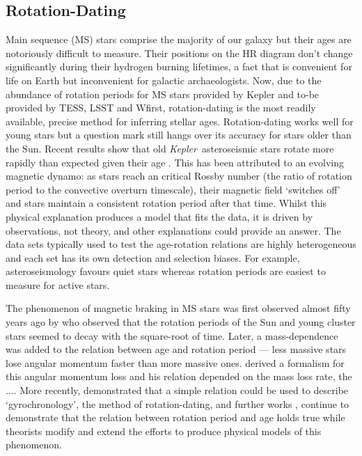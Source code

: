 \documentclass[useAMS, usenatbib, preprint, 12pt]{aastex}
\newcommand{\Kepler}{{\it Kepler}}
\newcommand{\kepler}{\Kepler}
\newcommand{\eg}{{\it e.g.}}
\begin{document}
\subsection{Rotation-Dating}
\label{sec:rotation}

Main sequence (MS) stars comprise the majority of our galaxy but their ages
are notoriously difficult to measure.
Their positions on the HR diagram don't change significantly during their
    hydrogen burning lifetimes, a fact that is convenient for life on Earth
    but inconvenient for galactic archaeologists.
Now, due to the abundance of rotation periods for MS stars provided by Kepler
    and to-be provided by TESS, LSST and Wfirst, rotation-dating is the most
    readily available, precise method for inferring stellar ages.
Rotation-dating works well for young stars but a question mark still hangs
    over its accuracy for stars older than the Sun.
Recent results show that old \kepler\ asteroseismic stars rotate more rapidly
    than expected given their age \citep[\eg][]{Angus2015, Vansaders2016,
    Metcalfe2016}.
This has been attributed to an evolving magnetic dynamo: as stars reach an
    critical Rossby number (the ratio of rotation period to the convective
    overturn timescale), their magnetic field `switches off' and stars
    maintain a consistent rotation period after that time.
Whilst this physical explanation produces a model that fits the data, it
    is driven by observations, not theory, and other explanations could
    provide an answer.
The data sets typically used to test the age-rotation relations are highly
    heterogeneous and each set has its own detection and selection biases.
For example, asteroseismology favours quiet stars whereas rotation periods are
    easiest to measure for active stars.

The phenomenon of magnetic braking in MS stars was first observed almost fifty
years ago by \citet{Skumanich1972} who observed that the rotation periods of
the Sun and young cluster stars seemed to decay with the square-root of time.
Later, a mass-dependence was added to the relation between age and rotation
period --- less massive stars lose angular momentum faster than more massive
ones.
\citet{Kawaler1988} derived a formalism for this angular momentum loss and his
relation depended on the mass loss rate, the ....
More recently, \citet{Barnes2003} demonstrated that a simple relation could be
used to describe `gyrochronology', the method of rotation-dating, and further
works \citep[\eg][]{Barnes2007, Mamajek2008, Barnes2010, Meibom2011},
continue to demonstrate that the relation between rotation period and age
holds true while theorists \citep[\eg][]{Matt2012, Epstein2014} modify and
extend the efforts to produce physical models of this phenomenon.
\end{document}
